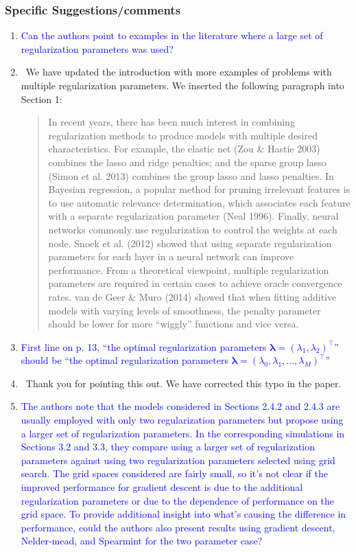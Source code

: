 \documentclass[]{article}
\newcommand{\point}[1]{\item \textcolor{blue}{#1}}
\newcommand{\reply}{\item[]\ }
\begin{document}
	\subsubsection*{Specific Suggestions/comments}
	
	\begin{enumerate}
		\point{Can the authors point to examples in the literature where a large set of regularization parameters was used?}
		
		\reply We have updated the introduction with more examples of problems with multiple regularization parameters. We inserted the following paragraph into Section 1:
		
		\begin{quote}
			In recent years, there has been much interest in combining regularization methods to produce models with multiple desired characteristics. For example, the elastic net (Zou \& Hastie 2003) combines the lasso and ridge penalties; and the sparse group lasso (Simon et al. 2013) combines the group lasso and lasso penalties. In Bayesian regression, a popular method for pruning irrelevant features is to use automatic relevance determination, which associates each feature with a separate regularization parameter (Neal 1996). Finally, neural networks commonly use regularization to control the weights at each node. Snoek et al. (2012) showed that using separate regularization parameters for each layer in a neural network can improve performance. From a theoretical viewpoint, multiple regularization parameters are required in certain cases to achieve oracle convergence rates. van de Geer \& Muro (2014) showed that when fitting additive models with varying levels of smoothness, the penalty parameter should be lower for more ``wiggly'' functions and vice versa. 
		\end{quote}
		
		\point{First line on p. 13, ``the optimal regularization parameters $\boldsymbol{\lambda} = (\lambda_1,\lambda_2)^\top$'' should be ``the optimal regularization parameters $\boldsymbol{\lambda} = (\lambda_0, \lambda_1, ... , \lambda_M)^\top$''}
		
		\reply Thank you for pointing this out. We have corrected this typo in the paper.
		
		\point{The authors note that the models considered in Sections 2.4.2 and 2.4.3 are usually employed with only two regularization parameters but propose using a larger set of regularization parameters. In the corresponding simulations in Sections 3.2 and 3.3, they compare using a larger set of regularization parameters against using two regularization parameters selected using grid search. The grid spaces considered are fairly small, so it’s not clear if the improved performance for gradient descent is due to the additional regularization parameters or due to the dependence of performance on the grid space. To provide additional insight into what’s causing the difference in performance, could the authors also present results using gradient descent, Nelder-mead, and Spearmint for the two parameter case?}
		

\end{enumerate}
\end{document}
